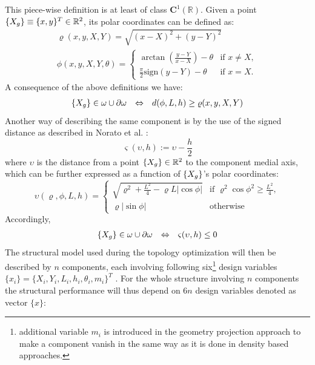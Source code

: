 This piece-wise definition is at least of class $\mathbf{C}^1(\mathbb{R})$. Given a point $ \left\{{X_g}\right\}\equiv \lbrace x,y \rbrace^T\in \mathbb{R}^2$, its polar coordinates can be defined as:
\begin{eqnarray}
    \varrho(x,y,X,Y)=\sqrt{(x-X)^2+(y-Y)^2}\\
    \phi(x,y,X,Y,\theta)  = \begin{cases}
    \arctan{\left(\frac{y-Y}{x-X}\right)}-\theta & \text{if } x\neq X,\\
    \frac{\pi}{2}\text{sign}(y-Y)-\theta & \text{if } x= X.
    \end{cases}
\end{eqnarray}
A consequence of the above definitions we have:
\begin{equation}
    \begin{array}{ccc}
   \left\{{X_g}\right\} \in \omega \cup \partial \omega & \Leftrightarrow & d(\phi,L,h)\geq \varrho(x,y,X,Y)
    \end{array}
\end{equation}
Another way of describing the same component is by the use of the signed distance as described in Norato et al. \cite{norato2015geometry}:
\begin{equation}
\label{varsimga}
    \varsigma(\upsilon,h):=\upsilon-\frac{h}{2}
\end{equation}
where $\upsilon$ is the distance from a point $ \left\{{X_g}\right\}\in \mathbb{R}^2$ to the component medial axis, which can be further expressed as a function of $ \left\{{X_g}\right\}$'s polar coordinates:
\begin{equation}
\label{upsilon}
     \upsilon(\varrho,\phi,L,h)=\begin{cases}
    \sqrt{\varrho^2+\frac{L^2}{4}-\varrho L|\cos{\phi}|} & \text{if }\varrho^2\cos{\phi}^2\geq \frac{L^2}{4},\\
               \varrho|\sin{\phi}| & \text{otherwise}
    \end{cases}
\end{equation}
Accordingly,
\begin{equation}
    \begin{array}{ccc}
   \left\{{X_g}\right\} \in \omega \cup \partial \omega & \Leftrightarrow & \varsigma(\upsilon,h)\leq 0\\
    \end{array}
\end{equation}
The structural model used during the topology optimization will then be described by $n$ components, each involving following six\footnote{additional variable $m_i$ is introduced in the geometry projection approach to make a component vanish in the same way as it is done in density based approaches.} design variables\\ $\lbrace x_i\rbrace=\lbrace X_i,Y_i,L_i,h_i,\theta_i ,m_i\rbrace^T$ . For the whole structure involving $n$ components the structural performance will thus depend on $6n$ design variables denoted as vector $\lbrace x\rbrace$:
